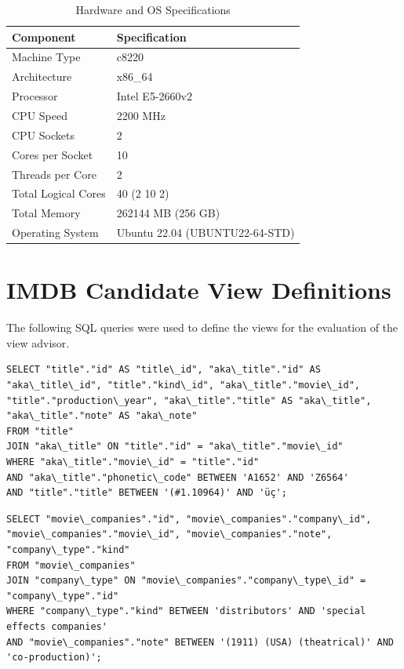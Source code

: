 \begin{appendices}
\begin{table}[H]
  \centering
  \caption{Hardware and OS Specifications}
  \label{tab:hardware_specs}
  \begin{tabular}{ll}
    \toprule
      \textbf{Component} & \textbf{Specification} \\ 
    \midrule
      Machine Type & c8220 \\
      Architecture & x86\_64 \\
      Processor & Intel E5-2660v2 \\
      CPU Speed & 2200 MHz \\
      CPU Sockets & 2 \\
      Cores per Socket & 10 \\
      Threads per Core & 2 \\
      Total Logical Cores & 40 (2 \texttimes{} 10 \texttimes{} 2) \\
      Total Memory & 262144 MB (256 GB) \\
      Operating System & Ubuntu 22.04 (UBUNTU22-64-STD) \\
    \bottomrule
  \end{tabular}
\end{table}

\section{IMDB Candidate View Definitions}
\label{sec:views}

The following SQL queries were used to define the views for the evaluation of the view advisor.

\begin{lstlisting}[caption={Query 1: Join on Title and AKA Title with phonetic filtering}]
SELECT "title"."id" AS "title\_id", "aka\_title"."id" AS "aka\_title\_id", "title"."kind\_id", "aka\_title"."movie\_id", "title"."production\_year", "aka\_title"."title" AS "aka\_title", "aka\_title"."note" AS "aka\_note" 
FROM "title" 
JOIN "aka\_title" ON "title"."id" = "aka\_title"."movie\_id" 
WHERE "aka\_title"."movie\_id" = "title"."id" 
AND "aka\_title"."phonetic\_code" BETWEEN 'A1652' AND 'Z6564' 
AND "title"."title" BETWEEN '(#1.10964)' AND 'üç';
\end{lstlisting}

\begin{lstlisting}[caption={Query 2: Movie Companies and Types}]
SELECT "movie\_companies"."id", "movie\_companies"."company\_id", "movie\_companies"."movie\_id", "movie\_companies"."note", "company\_type"."kind" 
FROM "movie\_companies" 
JOIN "company\_type" ON "movie\_companies"."company\_type\_id" = "company\_type"."id" 
WHERE "company\_type"."kind" BETWEEN 'distributors' AND 'special effects companies' 
AND "movie\_companies"."note" BETWEEN '(1911) (USA) (theatrical)' AND 'co-production)';
\end{lstlisting}


\end{appendices}
